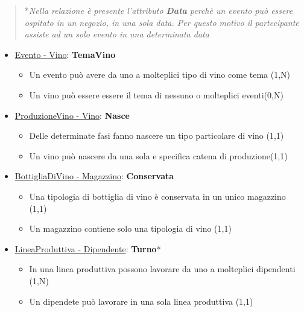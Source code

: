 \begin{verse}
	*\emph{Nella relazione è presente l'attributo \textbf{Data} perchè un evento può essere ospitato in un negozio, in una sola data. Per questo motivo il partecipante assiste ad un solo evento in una determinata data}
\end{verse}

\begin{itemize}
	\item \underline{Evento - Vino}: \textbf{TemaVino}
	
	\begin{itemize}
		\item Un evento può avere da uno a molteplici tipo di vino come tema (1,N)
		\item Un vino può essere essere il tema di nessuno o molteplici eventi(0,N)
	\end{itemize}
	
\end{itemize}

\begin{itemize}
	\item \underline{ProduzioneVino - Vino}: \textbf{Nasce}
	
	\begin{itemize}
		\item Delle determinate fasi fanno nascere un tipo particolare di vino (1,1)
		\item Un vino può nascere da una sola e specifica catena di produzione(1,1)
	\end{itemize}
	
\end{itemize}

\begin{itemize}
	\item \underline{BottigliaDiVino - Magazzino}: \textbf{Conservata}
	
	\begin{itemize}
		\item Una tipologia di bottiglia di vino è conservata in un unico magazzino (1,1)
		\item Un magazzino contiene solo una tipologia di vino (1,1)
	\end{itemize}
	
\end{itemize}


\begin{itemize}
	\item \underline{LineaProduttiva - Dipendente}: \textbf{Turno}*
	
	\begin{itemize}
		\item In una linea produttiva possono lavorare da uno a molteplici dipendenti (1,N)
		\item Un dipendete può lavorare in una sola linea produttiva (1,1)
	\end{itemize}
	
\end{itemize}

